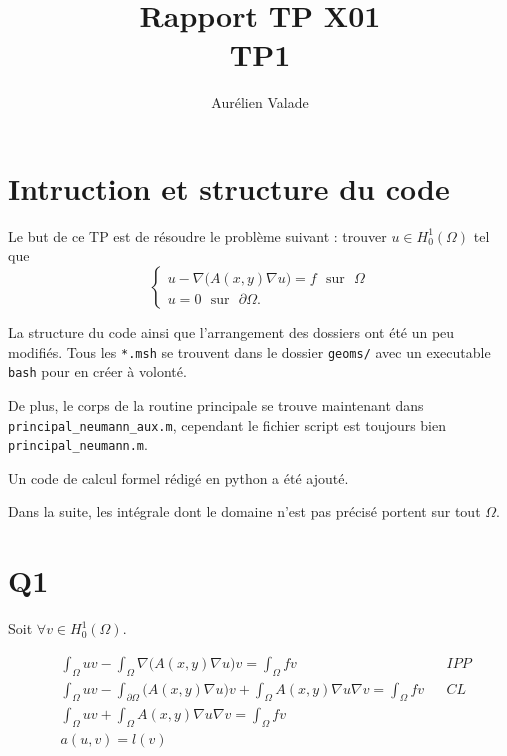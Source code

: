 \documentclass[11pt]{article}
\title{Rapport TP X01 \\ TP1}
\author{Aurélien Valade}
\date{}
\newcommand{\ms}{~~~}
\begin{document}
\maketitle

\section{Intruction et structure du code}


Le but de ce TP est de résoudre le problème suivant : trouver $u \in H^1_0(\Omega)$ tel que  
\begin{equation}
  \begin{cases}
    u - \nabla \big(A(x,y) \nabla u\big) = f \ms \mbox{sur}\ms \Omega\\
    u = 0 \ms \mbox{sur}\ms \partial\Omega.
  \end{cases}
\end{equation}

La structure du code ainsi que l'arrangement des dossiers ont été un peu modifiés. Tous les \texttt{*.msh} se trouvent dans le dossier \texttt{geoms/} avec un executable \texttt{bash} pour en créer à volonté.

De plus, le corps de la routine principale se trouve maintenant dans \texttt{principal\_neumann\_aux.m}, cependant le fichier script est toujours bien \texttt{principal\_neumann.m}. 

Un code de calcul formel rédigé en python a été ajouté. 

Dans la suite, les intégrale dont le domaine n'est pas précisé portent sur tout $\Omega$.
\section{Q1}

Soit $\forall v\in H^1_0(\Omega)$.

\begin{align}
  \label{eq:var}
  &\int_{\Omega} uv - \int_{\Omega} \nabla \big(A(x,y) \nabla u\big) v = \int_{\Omega} f v && IPP \\
  &\int_{\Omega} uv - \int_{\partial \Omega} \big(A(x,y) \nabla u\big) v + \int_{ \Omega} A(x,y) \nabla u \nabla v  = \int_{\Omega} f v  && CL\\
  &\int_{\Omega} uv + \int_{ \Omega} A(x,y) \nabla u \nabla v  = \int_{\Omega} f v \\
  &a(u,v) = l(v)
\end{align}
\end{document}

